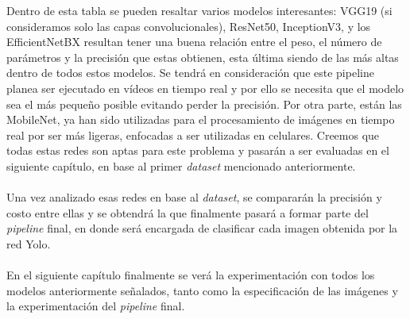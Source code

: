 Dentro de esta tabla se pueden resaltar varios modelos interesantes: VGG19 (si consideramos solo las capas convolucionales), ResNet50, InceptionV3, y los EfficientNetBX resultan tener una buena relación entre el peso, el número de parámetros y la precisión que estas obtienen, esta última siendo de las más altas dentro de todos estos modelos. Se tendrá en consideración que este pipeline planea ser ejecutado en vídeos en tiempo real y por ello se necesita que el modelo sea el más pequeño posible evitando perder la precisión. Por otra parte, están las MobileNet, ya han sido utilizadas para el procesamiento de imágenes en tiempo real por ser más ligeras, enfocadas a ser utilizadas en celulares. Creemos que todas estas redes son aptas para este problema y pasarán a ser evaluadas en el siguiente capítulo, en base al primer \textit{dataset} mencionado anteriormente. \\\\
Una vez analizado esas redes en base al \textit{dataset}, se compararán la precisión y costo entre ellas y se obtendrá la que finalmente pasará a formar parte del \textit{pipeline} final, en donde será encargada de clasificar cada imagen obtenida por la red Yolo.\\\\
En el siguiente capítulo finalmente se verá la experimentación con todos los modelos anteriormente señalados, tanto como la especificación de las imágenes y la experimentación del \textit{pipeline} final.
